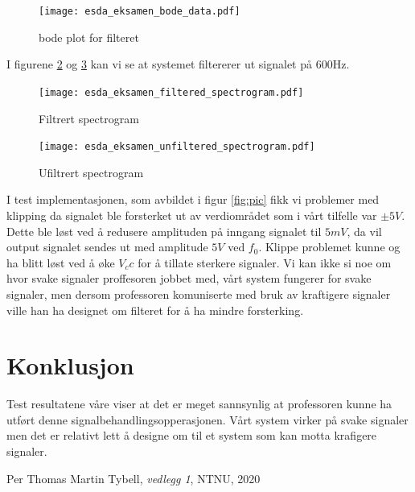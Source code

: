 \documentclass[a4paper,11pt,norsk]{article}
\begin{document}
\begin{figure}
\centering
	\texttt{[image: esda\_eksamen\_bode\_data.pdf]}
	\caption{bode plot for filteret}
\centering
\label{fig:bode}
\end{figure}
I figurene \ref{fig:filtered_spectrogram} og \ref{fig:unfiltered_spectrogram} kan vi se at systemet filtererer ut signalet på $600\si{\hertz}$. 

\begin{figure}
\centering
	\texttt{[image: esda\_eksamen\_filtered\_spectrogram.pdf]}
	\caption{Filtrert spectrogram}
\centering
\label{fig:filtered_spectrogram}
\end{figure}

\begin{figure}
\centering
	\texttt{[image: esda\_eksamen\_unfiltered\_spectrogram.pdf]}
	\caption{Ufiltrert spectrogram}
\centering
\label{fig:unfiltered_spectrogram}
\end{figure}

I test implementasjonen, som avbildet i figur \ref{fig:pic} fikk vi problemer med klipping da signalet ble forsterket ut av verdiområdet som i vårt tilfelle var $\pm5V$. Dette ble løst ved å redusere amplituden på inngang signalet til $5mV$, da vil output signalet sendes ut med amplitude $5V$ ved $f_0$. Klippe problemet kunne og ha blitt løst ved å øke $V_cc$ for å tillate sterkere signaler. Vi kan ikke si noe om hvor svake signaler proffesoren jobbet med, vårt system fungerer for svake signaler, men dersom professoren komuniserte med bruk av kraftigere signaler ville han ha designet om filteret for å ha mindre forsterking. 



\section{Konklusjon}
\label{sec:konklusjon}
Test resultatene våre viser at det er meget sannsynlig at professoren kunne ha utført denne signalbehandlingsopperasjonen. Vårt system virker på svake signaler men det er relativt lett å designe om til et system som  kan motta krafigere signaler.
{}
\begin{thebibliography}{99}

\bibitem{}
Per Thomas Martin Tybell, \textit{vedlegg 1}, NTNU, 2020



\end{thebibliography}
\end{document}
